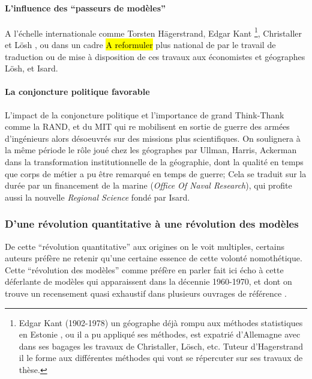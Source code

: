 \paragraph{L'influence des \enquote{passeurs de modèles}}

A l'échelle internationale comme Torsten Hägerstrand, Edgar Kant \footnote{Edgar Kant (1902-1978) un géographe déjà rompu aux méthodes statistiques en Estonie \autocite{Chabot1937} , ou il a pu appliqué ses méthodes, est expatrié d'Allemagne avec dans ses bagages les travaux de Christaller, Lösch, etc. Tuteur d'Hagerstrand il le forme aux différentes méthodes qui vont se répercuter sur ses travaux de thèse.}, Christaller et Lösh \autocite[119]{Berry1970}, ou dans un cadre \hl{A reformuler } plus national de par le travail de traduction ou de mise à disposition de ces travaux aux économistes et géographes Lösh, et Isard.

\paragraph{La conjoncture politique favorable}

L'impact de la conjoncture politique et l'importance de grand Think-Thank comme la RAND, et du MIT qui re mobilisent en sortie de guerre des armées d'ingénieurs alors désoeuvrés sur des missions plus scientifiques. On soulignera à la même période le rôle joué chez les géographes par Ullman, Harris, Ackerman dans la transformation institutionnelle de la géographie, dont la qualité en temps que corps de métier a pu être remarqué en temps de guerre; Cela se traduit sur la durée par un financement de la marine (\textit{Office Of Naval Research}), qui profite aussi la nouvelle \textit{Regional Science} fondé par Isard.

\subsubsection{D'une révolution quantitative à une révolution des modèles}
\label{ssec:revol_modele}

De cette \enquote{révolution quantitative} aux origines on le voit multiples, certains auteurs préfère ne retenir qu'une certaine essence de cette volonté nomothétique. Cette \enquote{révolution des modèles} comme préfère en parler \textcite{Wilson1970, Varenne2014} fait ici écho à cette déferlante de modèles qui apparaissent dans la décennie 1960-1970, et dont on trouve un recensement quasi exhaustif dans plusieurs ouvrages de référence \autocite{Haggett1965,Chorley1967}.

